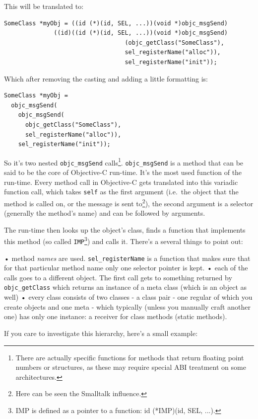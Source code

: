 \documentclass[a4paper, 11pt, fleqn]{book}
\begin{document}
This will be translated to:
\begin{verbatim}SomeClass *myObj = ((id (*)(id, SEL, ...))(void *)objc_msgSend)
              ((id)((id (*)(id, SEL, ...))(void *)objc_msgSend)
                                  (objc_getClass("SomeClass"),
                                  sel_registerName("alloc")), 
                                  sel_registerName("init"));
\end{verbatim}

Which after removing the casting and adding a little formatting is:

\begin{verbatim}SomeClass *myObj = 
  objc_msgSend(
    objc_msgSend(
      objc_getClass("SomeClass"),  
      sel_registerName("alloc")), 
    sel_registerName("init"));
\end{verbatim}

So it's two nested \verb=objc_msgSend= calls\footnote{There are actually specific functions for methods that return floating point numbers or structures, as these may require special ABI treatment on some architectures.}. \verb=objc_msgSend= is a method that can be said to be the core of Objective-C run-time. It's the most used function of the run-time. Every method call in Objective-C gets translated into this variadic function call, which takes \verb=self= as the first argument (i.e.\ the object that the method is called on, or the message is sent to\footnote{Here can be seen the Smalltalk influence.}), the second argument is a selector (generally the method's name) and can be followed by arguments.

The run-time then looks up the object's class, finds a function that implements this method (so called \verb=IMP=\footnote{IMP is defined as a pointer to a function: id (*IMP)(id, SEL, ...).}) and calls it. There's a several things to point out:

• method \emph{names} are used. \verb=sel_registerName= is a function that makes sure that for that particular method name only one selector pointer is kept.
• each of the calls goes to a different object. The first call gets to something returned by \verb=objc_getClass= which returns an instance of a meta class (which is an object as well)
• every class consists of two classes - a class pair - one regular of which you create objects and one meta - which typically (unless you manually craft another one) has only one instance: a receiver for class methods (static methods).

If you care to investigate this hierarchy, here's a small example:
\end{document}
